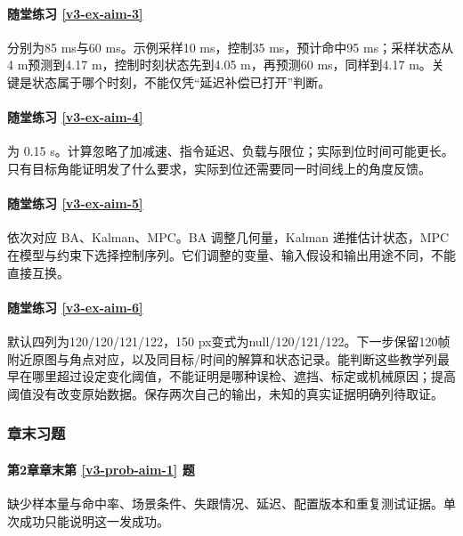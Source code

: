 \paragraph*{随堂练习 \ref{v3-ex-aim-3}}
\begin{solution}
分别为85 ms与60 ms。示例采样10 ms，控制35 ms，预计命中95 ms；采样状态从4 m预测到4.17 m，控制时刻状态先到4.05 m，再预测60 ms，同样到4.17 m。关键是状态属于哪个时刻，不能仅凭“延迟补偿已打开”判断。
\end{solution}

\paragraph*{随堂练习 \ref{v3-ex-aim-4}}
\begin{solution}
为 0.15 s。计算忽略了加减速、指令延迟、负载与限位；实际到位时间可能更长。只有目标角能证明发了什么要求，实际到位还需要同一时间线上的角度反馈。
\end{solution}

\paragraph*{随堂练习 \ref{v3-ex-aim-5}}
\begin{solution}
依次对应 BA、Kalman、MPC。BA 调整几何量，Kalman 递推估计状态，MPC在模型与约束下选择控制序列。它们调整的变量、输入假设和输出用途不同，不能直接互换。
\end{solution}

\paragraph*{随堂练习 \ref{v3-ex-aim-6}}
\begin{solution}
默认四列为120/120/121/122，150 px变式为null/120/121/122。下一步保留120帧附近原图与角点对应，以及同目标/时间的解算和状态记录。能判断这些教学列最早在哪里超过设定变化阈值，不能证明是哪种误检、遮挡、标定或机械原因；提高阈值没有改变原始数据。保存两次自己的输出，未知的真实证据明确列待取证。
\end{solution}

\subsubsection*{章末习题}
\paragraph*{第2章章末第 \ref{v3-prob-aim-1} 题}
\begin{solution}
缺少样本量与命中率、场景条件、失跟情况、延迟、配置版本和重复测试证据。单次成功只能说明这一发成功。
\end{solution}

